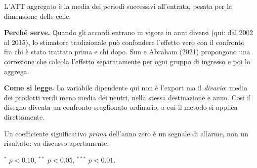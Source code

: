 \begin{table}[htbp]
\begin{threeparttable}
\begin{tablenotes}[flushleft]
\item L'ATT aggregato \`e la media dei periodi successivi all'entrata, pesata per la dimensione delle celle.
\item \textbf{Perch\'e serve.} Quando gli accordi entrano in vigore in anni diversi (qui: dal 2002 al 2015), lo stimatore tradizionale pu\`o confondere l'effetto vero con il confronto fra chi \`e stato trattato prima e chi dopo. Sun e Abraham (2021) propongono una correzione che calcola l'effetto separatamente per ogni gruppo di ingresso e poi lo aggrega.
\item \textbf{Come si legge.} La variabile dipendente qui non \`e l'export ma il \emph{divario}: media dei prodotti verdi meno media dei neutri, nella stessa destinazione e anno. Cos\`i il disegno diventa un confronto scaglionato ordinario, a cui il metodo si applica direttamente.
\item Un coefficiente significativo \emph{prima} dell'anno zero \`e un segnale di allarme, non un risultato: va discusso apertamente.
\item $^{*}$ $p<0.10$, $^{**}$ $p<0.05$, $^{***}$ $p<0.01$.
\end{tablenotes}
\end{threeparttable}
\end{table}
